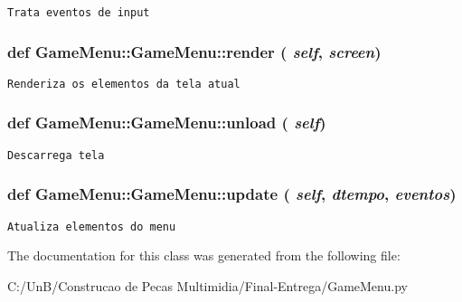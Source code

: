 \begin{footnotesize}\begin{verbatim}Trata eventos de input \end{verbatim}
\end{footnotesize}
 \hypertarget{class_game_menu_1_1_game_menu_a39d753b347e12a65ac3500beebdc3d8}{
\subsubsection[{render}]{\setlength{\rightskip}{0pt plus 5cm}def GameMenu::GameMenu::render ( {\em self}, \/   {\em screen})}}
\label{class_game_menu_1_1_game_menu_a39d753b347e12a65ac3500beebdc3d8}




\begin{footnotesize}\begin{verbatim}Renderiza os elementos da tela atual\end{verbatim}
\end{footnotesize}
 \hypertarget{class_game_menu_1_1_game_menu_bf73225ae1d5154228866a5a5ebb3306}{
\subsubsection[{unload}]{\setlength{\rightskip}{0pt plus 5cm}def GameMenu::GameMenu::unload ( {\em self})}}
\label{class_game_menu_1_1_game_menu_bf73225ae1d5154228866a5a5ebb3306}




\begin{footnotesize}\begin{verbatim}Descarrega tela\end{verbatim}
\end{footnotesize}
 \hypertarget{class_game_menu_1_1_game_menu_cc5129439eb900b90f5244edd26cc94d}{
\subsubsection[{update}]{\setlength{\rightskip}{0pt plus 5cm}def GameMenu::GameMenu::update ( {\em self}, \/   {\em dtempo}, \/   {\em eventos})}}
\label{class_game_menu_1_1_game_menu_cc5129439eb900b90f5244edd26cc94d}




\begin{footnotesize}\begin{verbatim}Atualiza elementos do menu\end{verbatim}
\end{footnotesize}
 

The documentation for this class was generated from the following file:\begin{CompactItemize}
\item 
C:/UnB/Construcao de Pecas Multimidia/Final-Entrega/GameMenu.py\end{CompactItemize}
